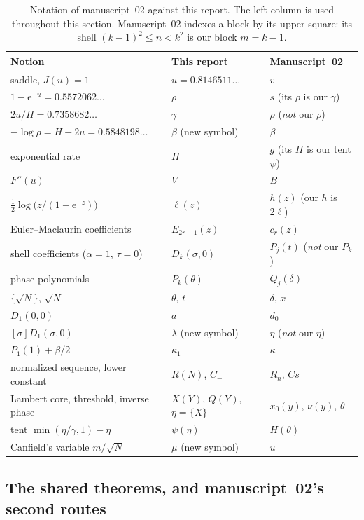 \documentclass[11pt,a4paper]{article}
\numberwithin{equation}{section}
\theoremstyle{definition}
\theoremstyle{remark}
\newcommand{\e}{\mathrm e}
\begin{document}
\begin{table}[htbp]
\centering\small
\begin{tabular}{@{}lll@{}}
\toprule
Notion & This report & Manuscript~02\\
\midrule
saddle, $J(u)=1$ & $u=0.8146511\ldots$ & $v$\\
$1-\e^{-u}=0.5572062\ldots$ & $\rho$ & $s$ (its $\rho$ is our $\gamma$)\\
$2u/H=0.7358682\ldots$ & $\gamma$ & $\rho$ (\emph{not} our $\rho$)\\
$-\log\rho=H-2u=0.5848198\ldots$ & $\beta$ (new symbol) & $\beta$\\
exponential rate & $H$ & $g$ (its $H$ is our tent $\psi$)\\
$F''(u)$ & $V$ & $B$\\
$\tfrac12\log\bigl(z/(1-\e^{-z})\bigr)$ & $\ell(z)$ & $h(z)$ (our $h$ is $2\ell$)\\
Euler--Maclaurin coefficients & $E_{2r-1}(z)$ & $c_r(z)$\\
shell coefficients ($\alpha=1$, $\tau=0$) & $D_k(\sigma,0)$ & $P_j(t)$ (\emph{not} our $P_k$)\\
phase polynomials & $P_k(\theta)$ & $Q_j(\delta)$\\
$\{\sqrt N\}$, $\sqrt N$ & $\theta$, $t$ & $\delta$, $x$\\
$D_1(0,0)$ & $a$ & $d_0$\\
$[\sigma]D_1(\sigma,0)$ & $\lambda$ (new symbol) & $\eta$ (\emph{not} our $\eta$)\\
$P_1(1)+\beta/2$ & $\kappa_1$ & $\kappa$\\
normalized sequence, lower constant & $R(N)$, $C_-$ & $R_n$, $Cs$\\
Lambert core, threshold, inverse phase & $X(Y)$, $Q(Y)$, $\eta=\{X\}$ & $x_0(y)$, $\nu(y)$, $\theta$\\
tent $\min(\eta/\gamma,1)-\eta$ & $\psi(\eta)$ & $H(\theta)$\\
Canfield's variable $m/\sqrt N$ & $\mu$ (new symbol) & $u$\\
\bottomrule
\end{tabular}
\caption{Notation of manuscript~02 against this report. The left column
is used throughout this section. Manuscript~02 indexes a block by its
upper square: its shell $(k-1)^2\le n<k^2$ is our block $m=k-1$.}
\label{srp:se:tab:dictionary}
\end{table}

\subsection{The shared theorems, and manuscript~02's second routes}
\label{srp:se:sec:shared}
\end{document}
